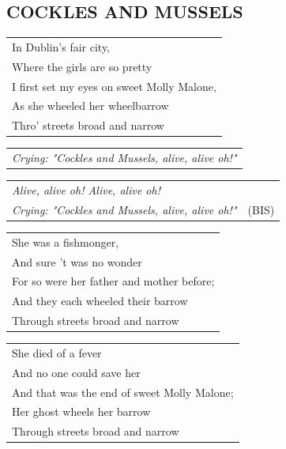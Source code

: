 \documentclass{article}
\begin{document}
\subsection*{COCKLES AND MUSSELS}
\begin{flushleft}
\begin{tabularx}{\textwidth} {
    >{\raggedright\arraybackslash}X}
In Dublin’s fair city,\\
Where the girls are so pretty\\
I first set my eyes on sweet Molly Malone,\\
As she wheeled her wheelbarrow\\
Thro’ streets broad and narrow\\
\end{tabularx}
\end{flushleft}
\begin{flushleft}
\begin{tabularx}{\textwidth} {
    >{\raggedright\arraybackslash}X}
\textit{Crying: "Cockles and Mussels, alive, alive oh!"}\\
\end{tabularx}
\begin{tabularx}{\textwidth} {
    >{\raggedright\arraybackslash}X |c}
\textit{Alive, alive oh! Alive, alive oh!} & \\
\textit{Crying: "Cockles and Mussels, alive, alive oh!"} & (BIS)\\
\end{tabularx}
\end{flushleft}
\begin{flushleft}
\begin{tabularx}{\textwidth} {
    >{\raggedright\arraybackslash}X}
She was a fishmonger,\\
And sure ’t was no wonder\\
For so were her father and mother before;\\
And they each wheeled their barrow\\
Through streets broad and narrow\\
\end{tabularx}
\end{flushleft}
\begin{flushleft}
\begin{tabularx}{\textwidth} {
    >{\raggedright\arraybackslash}X}
She died of a fever\\
And no one could save her\\
And that was the end of sweet Molly Malone;\\
Her ghost wheels her barrow\\
Through streets broad and narrow\\
\end{tabularx}
\end{flushleft}
\end{document}
